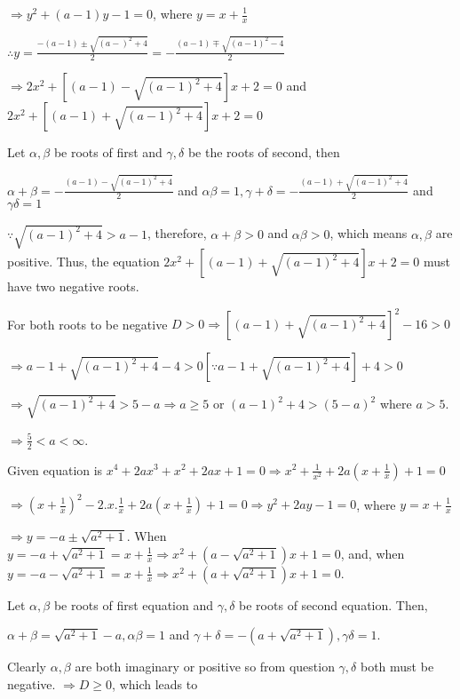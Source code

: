   $\Rightarrow y^2 + (a - 1)y - 1 = 0$, where $y = x + \frac{1}{x}$

  $\therefore y = \frac{-(a - 1)\pm\sqrt{(a - )^2 + 4}}{2} = -\frac{(a - 1)\mp\sqrt{(a - 1)^2 - 4}}{2}$

  $\Rightarrow 2x^2 + [(a - 1) - \sqrt{(a - 1)^2 + 4}]x + 2 = 0$ and $2x^2 + [(a - 1) + \sqrt{(a - 1)^2 +
      4}]x + 2 = 0$

  Let $\alpha, \beta$ be roots of first and $\gamma, \delta$ be the roots of second, then

  $\alpha + \beta = -\frac{(a - 1) - \sqrt{(a - 1)^2 + 4}}{2}$ and $\alpha\beta = 1, \gamma + \delta =
  -\frac{(a - 1) + \sqrt{(a - 1)^2 + 4}}{2}$ and $\gamma\delta = 1$

  $\because \sqrt{(a - 1)^2 + 4} > a - 1$, therefore, $\alpha + \beta > 0$ and $\alpha\beta > 0$, which
  means $\alpha, \beta$ are positive. Thus, the equation $2x^2 + [(a - 1) + \sqrt{(a - 1)^2 + 4}]x + 2 = 0$
  must have two negative roots.

  For both roots to be negative $D > 0 \Rightarrow [(a - 1) + \sqrt{(a - 1)^2 + 4}]^2 - 16 > 0$

  $\Rightarrow a - 1 + \sqrt{(a - 1)^2 + 4} - 4 > 0 [\because a - 1 + \sqrt{(a - 1)^2 + 4}] + 4 > 0$

  $\Rightarrow \sqrt{(a - 1)^2 + 4} > 5 - a \Rightarrow a\geq 5$ or $(a - 1)^2 + 4 > (5 - a)^2$ where $a >
  5$.

  $\Rightarrow \frac{5}{2} < a < \infty$.
\item Given equation is $x^4 + 2ax^3 + x^2 + 2ax + 1 = 0 \Rightarrow x^2 + \frac{1}{x^2} + 2a\left(x +
  \frac{1}{x}\right) + 1 = 0$

  $\Rightarrow \left(x + \frac{1}{x}\right)^2 - 2.x.\frac{1}{x} + 2a\left(x + \frac{1}{x}\right) + 1 = 0
  \Rightarrow y^2 + 2ay - 1 = 0$, where $y = x + \frac{1}{x}$

  $\Rightarrow y = -a\pm\sqrt{a^2 + 1}$. When $y = -a + \sqrt{a^2 + 1} = x + \frac{1}{x}\Rightarrow x^2 + (a
  - \sqrt{a^2 + 1})x + 1 = 0$, and, when $y = -a - \sqrt{a^2 + 1} = x + \frac{1}{x}\Rightarrow x^2 + (a +
  \sqrt{a^2 + 1})x + 1 = 0$.

  Let $\alpha,\beta$ be roots of first equation and $\gamma,\delta$ be roots of second equation. Then,

  $\alpha + \beta = \sqrt{a^2 + 1} - a, \alpha\beta = 1$ and $\gamma + \delta = -(a + \sqrt{a^2 + 1}),
  \gamma\delta = 1$.

  Clearly $\alpha, \beta$ are both imaginary or positive so from question $\gamma, \delta$ both must be
  negative. $\Rightarrow D\geq 0$, which leads to

